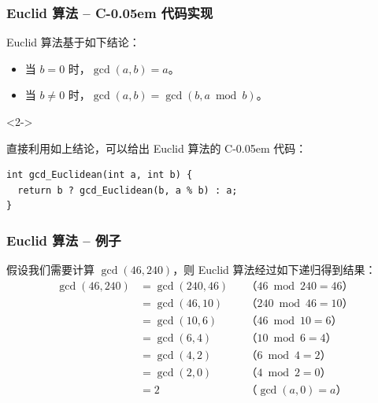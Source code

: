 \documentclass{../pkslide}
\newcommand{\Cpp}{\texorpdfstring{C\kern-0.05em\protect\raisebox{.35ex}{\textsmaller[2]{+\kern-0.05em+}}}{C++}}
\begin{document}
\begin{frame}[fragile]
  \frametitle{Euclid 算法 -- \Cpp{} 代码实现}
  Euclid 算法基于如下结论：
  
  \begin{itemize}
    \item 当 $b = 0$ 时，$\gcd(a, b) = a$。
    \item 当 $b \ne 0$ 时，$\gcd(a, b) = \gcd(b, a \bmod b)$。
  \end{itemize}
  
  \begin{uncoverenv}<2->
    \emptyline
    
    直接利用如上结论，可以给出 Euclid 算法的 \Cpp{} 代码：
      
\begin{verbatim}
int gcd_Euclidean(int a, int b) {
  return b ? gcd_Euclidean(b, a % b) : a;
}
\end{verbatim}
  \end{uncoverenv}
  
\end{frame}

\begin{frame}
  \frametitle{Euclid 算法 -- 例子}
  假设我们需要计算 $\gcd(46, 240)$，则 Euclid 算法经过如下递归得到结果：%
  \begin{align*}
    \gcd(46, 240) &= \gcd(240, 46) & & \text{（$46 \bmod 240 = 46$）} \\
    &= \gcd(46, 10) & & \text{（$240 \bmod 46 = 10$）} \\
    &= \gcd(10, 6) & & \text{（$46 \bmod 10 = 6$）} \\
    &= \gcd(6, 4) & & \text{（$10 \bmod 6 = 4$）} \\
    &= \gcd(4, 2) & & \text{（$6 \bmod 4 = 2$）} \\
    &= \gcd(2, 0) & & \text{（$4 \bmod 2 = 0$）} \\
    &= 2 & & \text{（$\gcd(a, 0) = a$）} \\
  \end{align*}
\end{frame}
\end{document}
